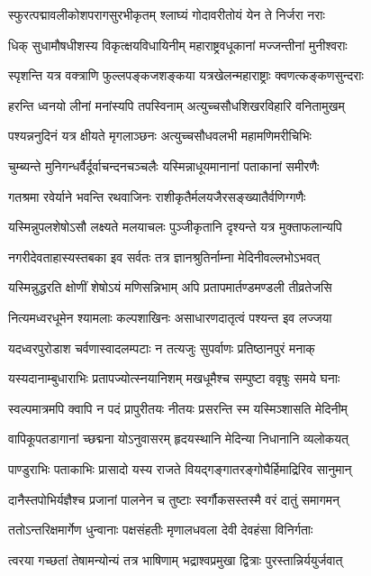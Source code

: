 \twolineshloka
{स्फुरत्पद्मावलीकोशपरागसुरभीकृतम्}
{श्लाघ्यं गोदावरीतोयं येन ते निर्जरा नराः} %

\twolineshloka
{धिक् सुधामौषधीशस्य विकृत्क्षयविधायिनीम्}
{महाराष्ट्रवधूकानां मज्जन्तीनां मुनीश्वराः} %

\twolineshloka
{स्पृशन्ति यत्र वक्त्राणि फुल्लपङ्कजशङ्कया}
{यत्रखेलन्महाराष्ट्राः क्वणत्कङ्कणसुन्दराः} %

\twolineshloka
{हरन्ति ध्वनयो लीनां मनांस्यपि तपस्विनाम्}
{अत्युच्चसौधशिखरविहारि वनितामुखम्} %

\twolineshloka
{पश्यन्ननुदिनं यत्र क्षीयते मृगलाञ्छनः}
{अत्युच्चसौधवलभी महामणिमरीचिभिः} %

\twolineshloka
{चुम्ब्यन्ते मुनिगन्धर्वैर्दूर्वाचन्दनचञ्चलैः}
{यस्मिन्नाधूयमानानां पताकानां समीरणैः} %

\twolineshloka
{गतश्रमा रवेर्याने भवन्ति रथवाजिनः}
{राशीकृतैर्मलयजैरसङ्ख्यातैर्वणिग्गणैः} %

\twolineshloka
{यस्मिन्नुपलशेषोऽसौ लक्ष्यते मलयाचलः}
{पुञ्जीकृतानि दृश्यन्ते यत्र मुक्ताफलान्यपि} %

\twolineshloka
{नगरीदेवताहास्यस्तबका इव सर्वतः}
{तत्र ज्ञानश्रुतिर्नाम्ना मेदिनीवल्लभोऽभवत्} %

\twolineshloka
{यस्मिन्नुद्धरति क्षोणीं शेषोऽयं मणिसन्निभाम्}
{अपि प्रतापमार्तण्डमण्डली तीव्रतेजसि} %

\twolineshloka
{नित्यमध्वरधूमेन श्यामलाः कल्पशाखिनः}
{असाधारणदातृत्वं पश्यन्त इव लज्जया} %

\twolineshloka
{यदध्वरपुरोडाश चर्वणास्वादलम्पटाः}
{न तत्यजुः सुपर्वाणः प्रतिष्ठानपुरं मनाक्} %

\twolineshloka
{यस्यदानाम्बुधाराभिः प्रतापज्योत्स्नयानिशम्}
{मखधूमैश्च सम्पुष्टा ववृषुः समये घनाः} %

\twolineshloka
{स्वल्पमात्रमपि क्वापि न पदं प्रापुरीतयः}
{नीतयः प्रसरन्ति स्म यस्मिञ्शासति मेदिनीम्} %

\twolineshloka
{वापिकूपतडागानां च्छद्मना योऽनुवासरम्}
{हृदयस्थानि मेदिन्या निधानानि व्यलोकयत्} %

\twolineshloka
{पाण्डुराभिः पताकाभिः प्रासादो यस्य राजते}
{वियद्गङ्गातरङ्गोघैर्हिमाद्रिरिव सानुमान्} %

\twolineshloka
{दानैस्तपोभिर्यज्ञैश्च प्रजानां पालनेन च}
{तुष्टाः स्वर्गौकसस्तस्मै वरं दातुं समागमन्} %

\twolineshloka
{ततोऽन्तरिक्षमार्गेण धुन्वानाः पक्षसंहतीः}
{मृणालधवला देवी देवहंसा विनिर्गताः} %

\twolineshloka
{त्वरया गच्छतां तेषामन्योन्यं तत्र भाषिणाम्}
{भद्राश्वप्रमुखा द्वित्राः पुरस्तान्निर्ययुर्जवात्} %

